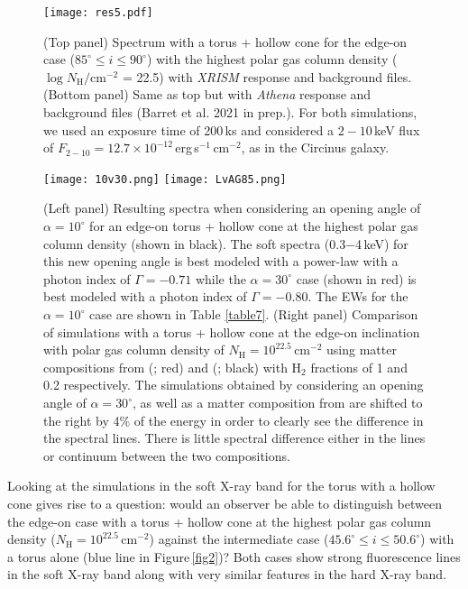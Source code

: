 \documentclass[fleqn,usenatbib]{mnras}
\begin{document}
            \begin{figure}
                \centering
                \texttt{[image: res5.pdf]}
                \caption{(Top panel) Spectrum with a torus + hollow cone for the edge-on case ($85^{\circ} \leq i \leq 90^{\circ}$) with the highest polar gas column density ($\log{N_{\mathrm{H}}}\big/\text{cm}^{-2}$ = 22.5) with \textit{XRISM} \citep{xrismscienceteam2020science} response and background files. (Bottom panel) Same as top but with \textit{Athena} \citep{2016SPIE.9905E..2FB} response and background files (Barret et al. 2021 in prep.). For both simulations, we used an exposure time of 200\,ks and considered a $2-10$\,keV flux of $F_{2-10} = 12.7\times10^{-12}$\,erg\,s$^{-1}$\,cm$^{-2}$, as in the Circinus galaxy.}
                \label{figres}
            \end{figure}
            
            \begin{figure*}
                \centering
                \texttt{[image: 10v30.png]}
                \texttt{[image: LvAG85.png]}
                \caption{(Left panel) Resulting spectra when considering an opening angle of $\alpha = 10^{\circ}$ for an edge-on torus + hollow cone at the highest polar gas column density (shown in black). The soft spectra (0.3$-$4\,keV) for this new opening angle is best modeled with a power-law with a photon index of $\Gamma = -0.71$ while the $\alpha = 30^{\circ}$ case (shown in red) is best modeled with a photon index of $\Gamma = -0.80$. The EWs for the $\alpha = 10^{\circ}$ case are shown in Table \ref{table7}. (Right panel) Comparison of simulations with a torus + hollow cone at the edge-on inclination with polar gas column density of $N_{\text{H}} = 10^{22.5}$\,cm$^{-2}$ using matter compositions from \citeauthor{1989GeCoA..53..197A} (\citeyear{1989GeCoA..53..197A}; red) and \citeauthor{2003ApJ...591.1220L} (\citeyear{2003ApJ...591.1220L}; black) with H$_{2}$ fractions of 1 and 0.2 respectively. The simulations obtained by considering an opening angle of $\alpha = 30^{\circ}$, as well as a matter composition from \protect\cite{2003ApJ...591.1220L} are shifted to the right by 4$\%$ of the energy in order to clearly see the difference in the spectral lines. There is little spectral difference either in the lines or continuum between the two compositions.}
                \label{fig10}
            \end{figure*}
        
            Looking at the simulations in the soft X-ray band for the torus with a hollow cone gives rise to a question: would an observer be able to distinguish between the edge-on case with a torus + hollow cone at the highest polar gas column density ($N_{\text{H}} = 10^{22.5}$\,cm$^{-2}$) against the intermediate case ($45.6^{\circ} \leq i \leq 50.6^{\circ}$) with a torus alone (blue line in Figure\,\ref{fig2})? Both cases show strong fluorescence lines in the soft X-ray band along with very similar features in the hard X-ray band.
            
\end{document}

